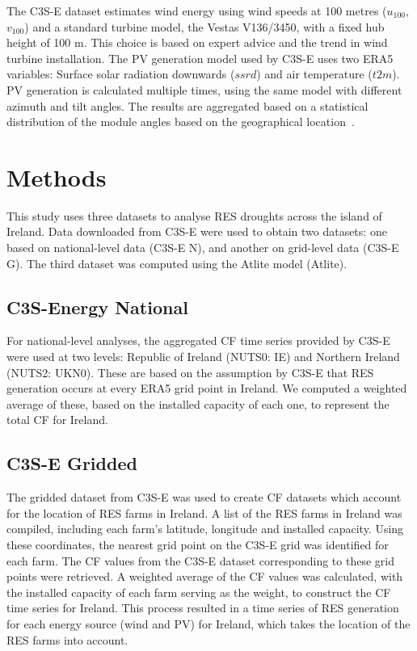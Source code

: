\documentclass[a4paper, 11pt]{article}
\begin{document}
The C3S-E dataset estimates wind energy using wind speeds at 100 metres ($u_{100}$, $v_{100}$) and a standard turbine model, the Vestas V136/3450, with a fixed hub height of 100 m. This choice is based on expert advice and the trend in wind turbine installation. The PV generation model used by C3S-E uses two ERA5 variables: Surface solar radiation downwards ($ssrd$) and air temperature ($t2m$). PV generation is calculated multiple times, using the same model with different azimuth and tilt angles. The results are aggregated based on a statistical distribution of the module angles based on the geographical location~\cite{saintdrenan2018solar}.

\section{Methods}
\label{sec:Methods}

This study uses three datasets to analyse RES droughts across the island of Ireland. Data downloaded from C3S-E were used to obtain two datasets: one based on national-level data (C3S-E N), and another on grid-level data (C3S-E G). The third dataset was computed using the Atlite model (Atlite).

\subsection{C3S-Energy National}
\label{sec:c3se_n}

For national-level analyses, the aggregated CF time series provided by C3S-E were used at two levels: Republic of Ireland (NUTS0: IE) and Northern Ireland (NUTS2: UKN0). These are based on the assumption by C3S-E that RES generation occurs at every ERA5 grid point in Ireland. We computed a weighted average of these, based on the installed capacity of each one, to represent the total CF for Ireland.

\subsection{C3S-E Gridded}
\label{sec:c3se_g}

The gridded dataset from C3S-E was used to create CF datasets which account for the location of RES farms in Ireland. A list of the RES farms in Ireland was compiled, including each farm’s latitude, longitude and installed capacity. Using these coordinates, the nearest grid point on the C3S-E grid was identified for each farm. The CF values from the C3S-E dataset corresponding to these grid points were retrieved. A weighted average of the CF values was calculated, with the installed capacity of each farm serving as the weight, to construct the CF time series for Ireland. This process resulted in a time series of RES generation for each energy source (wind and PV) for Ireland, which takes the location of the RES farms into account.
\end{document}
